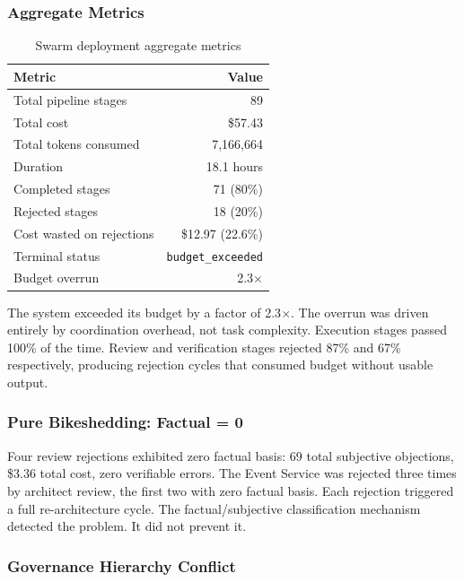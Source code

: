 \documentclass[11pt,a4paper]{article}
\begin{document}
\subsubsection{Aggregate Metrics}

\begin{table}[H]
\centering
\caption{Swarm deployment aggregate metrics}
\label{tab:aggregate}
\begin{tabular}{@{}lr@{}}
\toprule
\textbf{Metric} & \textbf{Value} \\
\midrule
Total pipeline stages & 89 \\
Total cost & \$57.43 \\
Total tokens consumed & 7,166,664 \\
Duration & 18.1 hours \\
Completed stages & 71 (80\%) \\
Rejected stages & 18 (20\%) \\
Cost wasted on rejections & \$12.97 (22.6\%) \\
Terminal status & \texttt{budget\_exceeded} \\
Budget overrun & 2.3$\times$ \\
\bottomrule
\end{tabular}
\end{table}

The system exceeded its budget by a factor of 2.3$\times$. The overrun was driven entirely by coordination overhead, not task complexity. Execution stages passed 100\% of the time. Review and verification stages rejected 87\% and 67\% respectively, producing rejection cycles that consumed budget without usable output.

\subsubsection{Pure Bikeshedding: Factual = 0}

Four review rejections exhibited zero factual basis: 69 total subjective objections, \$3.36 total cost, zero verifiable errors. The Event Service was rejected three times by architect review, the first two with zero factual basis. Each rejection triggered a full re-architecture cycle. The factual/subjective classification mechanism detected the problem. It did not prevent it.

\subsubsection{Governance Hierarchy Conflict}
\end{document}
